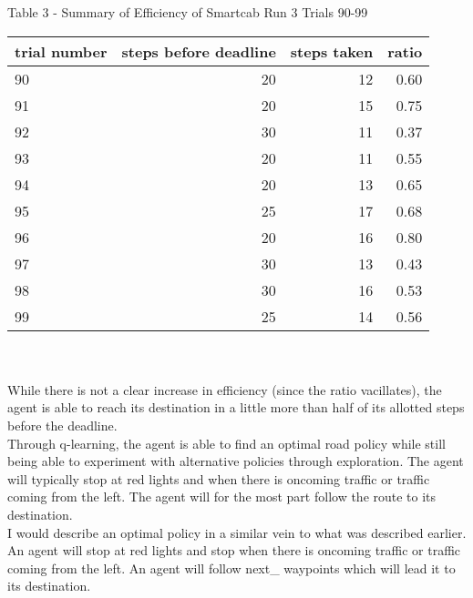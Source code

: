 \documentclass[11pt]{article}
\begin{document}
\begin{center} Table 3 - Summary of Efficiency of Smartcab Run 3 Trials 90-99

\begin{tabular}{ l r r r } \\
  \hline
  trial number & steps before deadline & steps taken & ratio\\
  \hline
  90 & 20 & 12 & 0.60 \\
  91 & 20 & 15 & 0.75 \\
  92 & 30 & 11 & 0.37 \\
  93 & 20 & 11 & 0.55 \\
  94 & 20 & 13 & 0.65 \\
  95 & 25 & 17 & 0.68 \\
  96 & 20 & 16 & 0.80 \\
  97 & 30 & 13 & 0.43 \\
  98 & 30 & 16 & 0.53 \\
  99 & 25 & 14 & 0.56 \\
\end{tabular}
\end{center}
\\

\\  

While there is not a clear increase in efficiency (since the ratio vacillates), the agent is able to reach its destination in a little more than half of its allotted steps before the deadline.\\

Through q-learning, the agent is able to find an optimal road policy while still being able to experiment with alternative policies through exploration. The agent will typically stop at red lights and when there is oncoming traffic or traffic coming from the left. The agent will for the most part follow the route to its destination.\\

I would describe an optimal policy in a similar vein to what was described earlier. An agent will stop at red lights and stop when there is oncoming traffic or traffic coming from the left. An agent will follow next\_ waypoints which will lead it to its destination.\\
\end{document}
